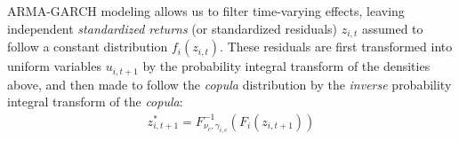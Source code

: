 ARMA-GARCH modeling allows us to filter time-varying effects, leaving independent \emph{standardized returns} (or standardized residuals) $z_{i,t}$ assumed to follow a constant distribution $f_i(z_{i,t})$. These residuals are first transformed into uniform variables $u_{i,t+1}$ by the probability integral transform of the densities above, and then made to follow the \emph{copula} distribution by the \emph{inverse} probability integral transform of the \emph{copula}:
\begin{align}
  z_{i,t+1}^* = F^{-1}_{\nu_c,\gamma_{i,c}}(F_{i}(z_{i,t+1}))
\end{align}




